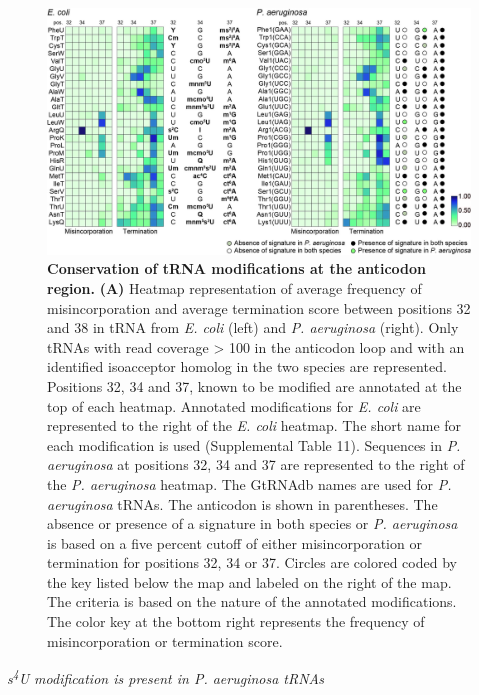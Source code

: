 \documentclass[times, twoside]{zHenriquesLab-StyleBioRxiv}
\begin{document}
\begin{figure}[h]
    \centering
    \includegraphics[width=1\linewidth]{Figure3.jpg}
    \caption{\textbf{Conservation of tRNA modifications at the anticodon region.} 
\textbf{(A) }Heatmap representation of average frequency of misincorporation and average termination score between positions 32 and 38 in tRNA from \textit{E. coli} (left) and \textit{P. aeruginosa} (right). Only tRNAs with read coverage > 100 in the anticodon loop and with an identified isoacceptor homolog in the two species are represented. Positions 32, 34 and 37, known to be modified are annotated at the top of each heatmap. Annotated modifications for \textit{E. coli} are represented to the right of the \textit{E. coli} heatmap. The short name for each modification is used (Supplemental Table 11). Sequences in \textit{P. aeruginosa} at positions 32, 34 and 37 are represented to the right of the \textit{P. aeruginosa} heatmap. The GtRNAdb names are used for \textit{P. aeruginosa} tRNAs. The anticodon is shown in parentheses. The absence or presence of a signature in both species or \textit{P. aeruginosa} is based on a five percent cutoff of either misincorporation or termination for positions 32, 34 or 37. Circles are colored coded by the key listed below the map and labeled on the right of the map. The criteria is based on the nature of the annotated modifications. The color key at the bottom right represents the frequency of misincorporation or termination score. 
}
    \label{fig:enter-label}
\end{figure}
\textit{s\textsuperscript{4}U modification is present in P. aeruginosa tRNAs } \newline
\end{document}
